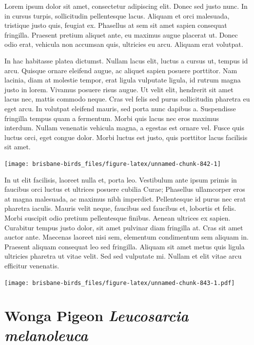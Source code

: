 \documentclass[]{book}
\let\origfigure\figure
\let\endorigfigure\endfigure
\renewenvironment{figure}[1][2] {
  \expandafter\origfigure\expandafter[H]
} {
  \endorigfigure
}
\begin{document}
Lorem ipsum dolor sit amet, consectetur adipiscing elit. Donec sed justo
nunc. In in cursus turpis, sollicitudin pellentesque lacus. Aliquam et
orci malesuada, tristique justo quis, feugiat ex. Phasellus at sem sit
amet sapien consequat fringilla. Praesent pretium aliquet ante, eu
maximus augue placerat ut. Donec odio erat, vehicula non accumsan quis,
ultricies eu arcu. Aliquam erat volutpat.

In hac habitasse platea dictumst. Nullam lacus elit, luctus a cursus ut,
tempus id arcu. Quisque ornare eleifend augue, ac aliquet sapien posuere
porttitor. Nam lacinia, diam at molestie tempor, erat ligula vulputate
ligula, id rutrum magna justo in lorem. Vivamus posuere risus augue. Ut
velit elit, hendrerit sit amet lacus nec, mattis commodo neque. Cras vel
felis sed purus sollicitudin pharetra eu eget arcu. In volutpat eleifend
mauris, sed porta nunc dapibus a. Suspendisse fringilla tempus quam a
fermentum. Morbi quis lacus nec eros maximus interdum. Nullam venenatis
vehicula magna, a egestas est ornare vel. Fusce quis luctus orci, eget
congue dolor. Morbi luctus est justo, quis porttitor lacus facilisis sit
amet.

\begin{figure}
\texttt{[image: brisbane-birds\_files/figure-latex/unnamed-chunk-842-1]} \caption{insert figure caption}\label{fig:unnamed-chunk-842}
\end{figure}

In ut elit facilisis, laoreet nulla et, porta leo. Vestibulum ante ipsum
primis in faucibus orci luctus et ultrices posuere cubilia Curae;
Phasellus ullamcorper eros at magna malesuada, ac maximus nibh
imperdiet. Pellentesque id purus nec erat pharetra iaculis. Mauris velit
neque, faucibus sed faucibus et, lobortis et felis. Morbi suscipit odio
pretium pellentesque finibus. Aenean ultrices ex sapien. Curabitur
tempus justo dolor, sit amet pulvinar diam fringilla at. Cras sit amet
auctor ante. Maecenas laoreet nisi sem, elementum condimentum sem
aliquam in. Praesent aliquam consequat leo sed fringilla. Aliquam sit
amet metus quis ligula ultricies pharetra ut vitae velit. Sed sed
vulputate mi. Nullam et elit vitae arcu efficitur venenatis.

\begin{figure}
\centering
\texttt{[image: brisbane-birds\_files/figure-latex/unnamed-chunk-843-1.pdf]}
\caption{\label{fig:unnamed-chunk-843}insert figure caption}
\end{figure}

\section{\texorpdfstring{Wonga Pigeon \emph{Leucosarcia
melanoleuca}}{Wonga Pigeon Leucosarcia melanoleuca}}\label{wonga-pigeon-leucosarcia-melanoleuca}
\end{document}
